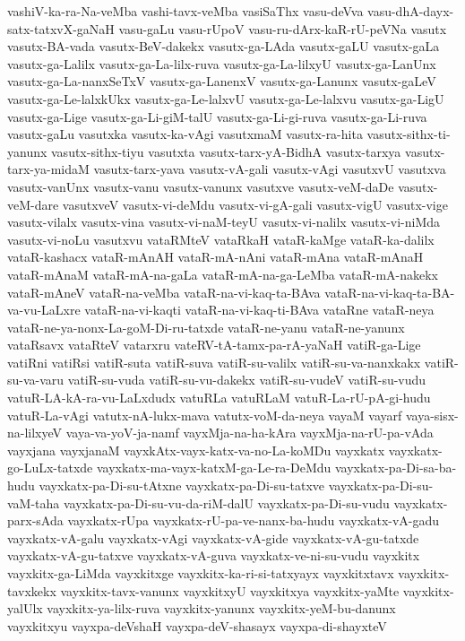 {vashiV-ka-ra-Na-veMba
vashi-tavx-veMba
vasiSaThx
vasu-deVva
vasu-dhA-dayx-satx-tatxvX-gaNaH
vasu-gaLu
vasu-rUpoV
vasu-ru-dArx-kaR-rU-peVNa
vasutx
vasutx-BA-vada
vasutx-BeV-dakekx
vasutx-ga-LAda
vasutx-gaLU
vasutx-gaLa
vasutx-ga-Lalilx
vasutx-ga-La-lilx-ruva
vasutx-ga-La-lilxyU
vasutx-ga-LanUnx
vasutx-ga-La-nanxSeTxV
vasutx-ga-LanenxV
vasutx-ga-Lanunx
vasutx-gaLeV
vasutx-ga-Le-lalxkUkx
vasutx-ga-Le-lalxvU
vasutx-ga-Le-lalxvu
vasutx-ga-LigU
vasutx-ga-Lige
vasutx-ga-Li-giM-talU
vasutx-ga-Li-gi-ruva
vasutx-ga-Li-ruva
vasutx-gaLu
vasutxka
vasutx-ka-vAgi
vasutxmaM
vasutx-ra-hita
vasutx-sithx-ti-yanunx
vasutx-sithx-tiyu
vasutxta
vasutx-tarx-yA-BidhA
vasutx-tarxya
vasutx-tarx-ya-midaM
vasutx-tarx-yava
vasutx-vA-gali
vasutx-vAgi
vasutxvU
vasutxva
vasutx-vanUnx
vasutx-vanu
vasutx-vanunx
vasutxve
vasutx-veM-daDe
vasutx-veM-dare
vasutxveV
vasutx-vi-deMdu
vasutx-vi-gA-gali
vasutx-vigU
vasutx-vige
vasutx-vilalx
vasutx-vina
vasutx-vi-naM-teyU
vasutx-vi-nalilx
vasutx-vi-niMda
vasutx-vi-noLu
vasutxvu
vataRMteV
vataRkaH
vataR-kaMge
vataR-ka-dalilx
vataR-kashacx
vataR-mAnAH
vataR-mA-nAni
vataR-mAna
vataR-mAnaH
vataR-mAnaM
vataR-mA-na-gaLa
vataR-mA-na-ga-LeMba
vataR-mA-nakekx
vataR-mAneV
vataR-na-veMba
vataR-na-vi-kaq-ta-BAva
vataR-na-vi-kaq-ta-BA-va-vu-LaLxre
vataR-na-vi-kaqti
vataR-na-vi-kaq-ti-BAva
vataRne
vataR-neya
vataR-ne-ya-nonx-La-goM-Di-ru-tatxde
vataR-ne-yanu
vataR-ne-yanunx
vataRsavx
vataRteV
vatarxru
vateRV-tA-tamx-pa-rA-yaNaH
vatiR-ga-Lige
vatiRni
vatiRsi
vatiR-suta
vatiR-suva
vatiR-su-valilx
vatiR-su-va-nanxkakx
vatiR-su-va-varu
vatiR-su-vuda
vatiR-su-vu-dakekx
vatiR-su-vudeV
vatiR-su-vudu
vatuR-LA-kA-ra-vu-LaLxdudx
vatuRLa
vatuRLaM
vatuR-La-rU-pA-gi-hudu
vatuR-La-vAgi
vatutx-nA-lukx-mava
vatutx-voM-da-neya
vayaM
vayarf
vaya-sisx-na-lilxyeV
vaya-va-yoV-ja-namf
vayxMja-na-ha-kAra
vayxMja-na-rU-pa-vAda
vayxjana
vayxjanaM
vayxkAtx-vayx-katx-va-no-La-koMDu
vayxkatx
vayxkatx-go-LuLx-tatxde
vayxkatx-ma-vayx-katxM-ga-Le-ra-DeMdu
vayxkatx-pa-Di-sa-ba-hudu
vayxkatx-pa-Di-su-tAtxne
vayxkatx-pa-Di-su-tatxve
vayxkatx-pa-Di-su-vaM-taha
vayxkatx-pa-Di-su-vu-da-riM-dalU
vayxkatx-pa-Di-su-vudu
vayxkatx-parx-sAda
vayxkatx-rUpa
vayxkatx-rU-pa-ve-nanx-ba-hudu
vayxkatx-vA-gadu
vayxkatx-vA-galu
vayxkatx-vAgi
vayxkatx-vA-gide
vayxkatx-vA-gu-tatxde
vayxkatx-vA-gu-tatxve
vayxkatx-vA-guva
vayxkatx-ve-ni-su-vudu
vayxkitx
vayxkitx-ga-LiMda
vayxkitxge
vayxkitx-ka-ri-si-tatxyayx
vayxkitxtavx
vayxkitx-tavxkekx
vayxkitx-tavx-vanunx
vayxkitxyU
vayxkitxya
vayxkitx-yaMte
vayxkitx-yalUlx
vayxkitx-ya-lilx-ruva
vayxkitx-yanunx
vayxkitx-yeM-bu-danunx
vayxkitxyu
vayxpa-deVshaH
vayxpa-deV-shasayx
vayxpa-di-shayxteV
}
